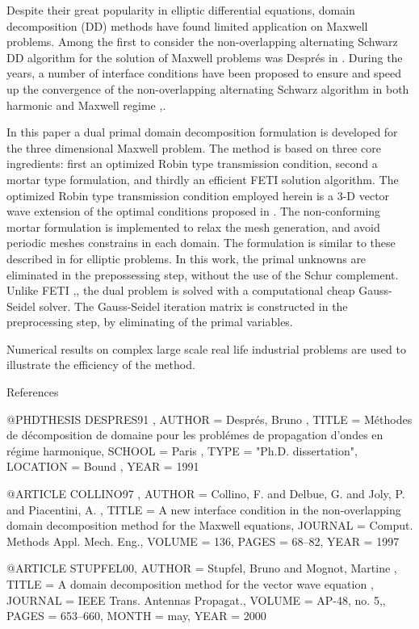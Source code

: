 \documentclass{report}
\begin{document}
Despite their great popularity in elliptic differential equations,
domain decomposition (DD) methods have found limited application on
Maxwell problems. Among the first to consider the non-overlapping
alternating Schwarz DD algorithm for the solution of Maxwell
problems was Despr\'{e}s in \cite{DESPRES91}. During the years, a
number of interface conditions have been proposed to ensure and speed
up the convergence of the non-overlapping alternating Schwarz
algorithm in both harmonic and Maxwell regime
\cite{COLLINO97},\cite{STUPFEL00}.

In this paper a dual primal domain decomposition formulation is
developed for the three dimensional Maxwell problem. The method is
based on three core ingredients: first an optimized Robin type
transmission condition, second a mortar type formulation, and thirdly
an efficient FETI solution algorithm. The optimized Robin type
transmission condition employed herein is a 3-D vector wave extension
of the optimal conditions proposed in \cite{GANDER02}. The
non-conforming mortar formulation is implemented to relax the mesh
generation, and avoid periodic meshes constrains in each domain. The
formulation is similar to these described in \cite{WOHLMUTH01} for
elliptic problems. In this work, the primal unknowns are eliminated in
the prepossessing step, without the use of the Schur
complement. Unlike FETI \cite{FARHAT91},\cite{PAVARINO02}, the dual
problem is solved with a computational cheap Gauss-Seidel solver. The
Gauss-Seidel iteration matrix is constructed in the preprocessing
step, by eliminating of the primal variables.

Numerical results on complex large scale real life industrial
problems are used to illustrate the efficiency of the method.


References

@PHDTHESIS{ DESPRES91 ,
AUTHOR = { Despr\'{e}s, Bruno },
TITLE = { M\'{e}thodes de d\'{e}composition de domaine pour
les probl\'{e}mes de propagation d'ondes en r\'{e}gime
harmonique},
SCHOOL = { Paris },
TYPE = "{Ph.D.} dissertation",
LOCATION = { Bound },
YEAR = { 1991}}


@ARTICLE{ COLLINO97 ,
AUTHOR = { Collino, F. and Delbue, G. and Joly, P. and
Piacentini, A. },
TITLE = { A new interface condition in the non-overlapping
domain decomposition method for the {M}axwell equations},
JOURNAL = { Comput. Methods Appl. Mech. Eng.},
VOLUME = { 136},
PAGES = { 68--82},
YEAR = { 1997 }}

@ARTICLE{ STUPFEL00,
AUTHOR = { Stupfel, Bruno and Mognot, Martine },
TITLE = { A domain decomposition method for the vector
wave equation },
JOURNAL = { IEEE Trans. Antennas Propagat.},
VOLUME = { AP-48, no. 5,},
PAGES = { 653--660},
MONTH = may,
YEAR = { 2000 }}
\end{document}

